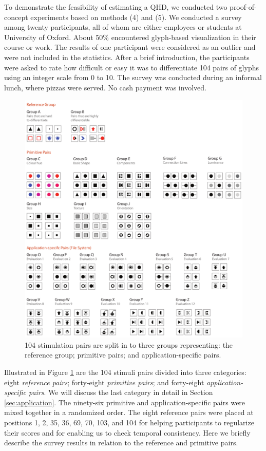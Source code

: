 To demonstrate the feasibility of estimating a QHD, we conducted two proof-of-concept experiments based on methods (4) and (5).
We conducted a survey among twenty participants, all of whom are either employees or students at University of Oxford.
About 50\% encountered glyph-based visualization in their course or work.
The results of one participant were considered as an outlier and were not included in the statistics.
After a brief introduction, the participants were asked to rate how difficult or easy it was to differentiate 104 pairs of glyphs using an integer scale from 0 to 10.
The survey was conducted during an informal lunch, where pizzas were served.
No cash payment was involved.

\begin{figure}[h!]
\begin{center}
\includegraphics[width=\textwidth]{images/filesystem/evaluation_groups}
\end{center}
\caption{104 stimulation pairs are split in to three groups representing: the reference group; primitive pairs; and application-specific pairs.}
\label{fig:evaluation_groups}
\end{figure}


Illustrated in Figure \ref{fig:evaluation_groups} are the 104 stimuli pairs divided into three categories: eight \emph{reference pairs}; forty-eight \emph{primitive pairs}; and forty-eight \emph{application-specific pairs}.
We will discuss the last category in detail in Section \ref{sec:application}.
The ninety-six primitive and application-specific pairs were mixed together in a randomized order.
The eight reference pairs were placed at positions 1, 2, 35, 36, 69, 70, 103, and 104 for helping participants to regularize their scores and for enabling us to check temporal consistency.
Here we briefly describe the survey results in relation to the reference and primitive pairs.

